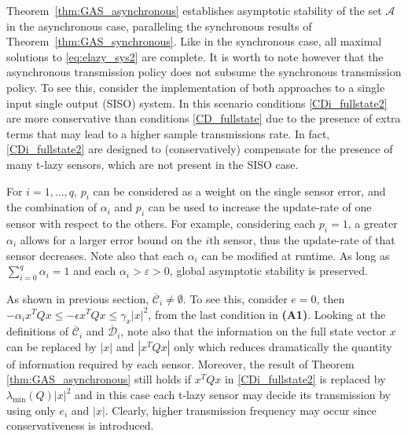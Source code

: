 \documentclass[twocolumn]{autart}
\begin{document}
{
Theorem~\ref{thm:GAS_asynchronous} establishes asymptotic
stability of the set $\mathcal{A}$ in the asynchronous
case, paralleling the synchronous results of Theorem~\ref{thm:GAS_synchronous}.
Like in the synchronous case,
all maximal solutions to \eqref{eq:elazy_sys2} are complete.
It is worth to note
however that the asynchronous transmission policy does not subsume the 
synchronous transmission policy. To see this, consider the implementation
of both approaches to a single input single output (SISO) system. 
In this scenario conditions \eqref{CDi_fullstate2} 
are more conservative than conditions \eqref{CD_fullstate} due to the
presence of extra terms that may
lead to a higher sample transmissions rate. In fact, 
\eqref{CDi_fullstate2} are designed to (conservatively) compensate for the presence of 
many t-lazy sensors, which are not present in the SISO case.
}

For $i=1,\dots,q$, $p_i$ can be considered as a weight on the 
single sensor error, and the combination of $\alpha_i$ and $p_i$ 
can be used to increase the update-rate 
of one sensor with respect to the others.
For example, considering each $p_i=1$, 
a greater $\alpha_i$ allows for a larger error 
bound on the $i$th sensor, thus the update-rate of that sensor 
decreases. 
Note also that each $\alpha_i$ can be modified at runtime. 
As long as $\sum_{i=0}^q \alpha_i=1$ and each 
$\alpha_i>\varepsilon>0$, global asymptotic stability is preserved. 

As shown in previous section, 
$\overline{\mathcal{C}}_i \neq \emptyset$. To see this,
consider $e=0$, then 
$-\alpha_i x^TQx \leq -\epsilon x^T Q x \leq \gamma_x|x|^2$,
from the last condition in \textbf{(A1)}. 
Looking at the definitions of $\overline{\mathcal{C}}_i$ and $\overline{\mathcal{D}}_i$,
note also that the information on the full state vector $x$ 
can be replaced by $|x|$ and $|x^TQx|$ only { which reduces 
dramatically the quantity of information required by each sensor}. 
Moreover, 
the result of Theorem \ref{thm:GAS_asynchronous}
still holds if $x^T Q x$ in \eqref{CDi_fullstate2} is 
replaced by $\lambda_{\min}(Q)|x|^2$ and in this case each t-lazy sensor
may decide its transmission by using only $e_i$ and $|x|$. 
Clearly, higher transmission frequency may occur 
since conservativeness is introduced.
\end{document}
